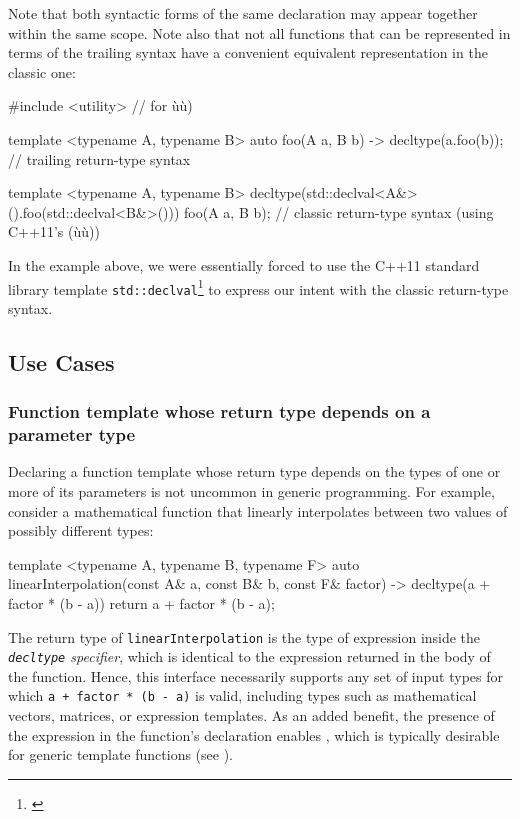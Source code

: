 \noindent Note that both syntactic forms of the same declaration may appear
together within the same scope. Note also that not all functions that
can be represented in terms of the trailing syntax have a convenient
equivalent representation in the classic one:

\begin{emcppslisting}
#include <utility>  // for ù{}ù)

template <typename A, typename B>
auto foo(A a, B b) -> decltype(a.foo(b));
    // trailing return-type syntax

template <typename A, typename B>
decltype(std::declval<A&>().foo(std::declval<B&>())) foo(A a, B b);
    // classic return-type syntax (using C++11's (ù{}ù))
\end{emcppslisting}

\noindent In the example above, we were essentially forced to use the C++11
standard library template \lstinline!std::declval!\footnote{\cite{cpprefdeclval}} to express our intent with the classic
return-type syntax.

\subsection[Use Cases]{Use Cases}\label{use-cases}

\subsubsection[Function template whose return type depends on a parameter type]{Function template whose return type depends on a parameter type}\label{function-template-whose-return-type-depends-on-a-parameter-type}

Declaring a function template whose return type depends on the types of
one or more of its parameters is not uncommon in generic programming.
For example, consider a mathematical function that linearly interpolates
between two values of possibly different types:

\begin{emcppslisting}
template <typename A, typename B, typename F>
auto linearInterpolation(const A& a, const B& b, const F& factor)
    -> decltype(a + factor * (b - a))
{
    return a + factor * (b - a);
}
\end{emcppslisting}

\noindent The return type of \lstinline!linearInterpolation! is the type of
expression inside the \emph{\lstinline!decltype! specifier}, which is
identical to the expression returned in the body of the function. Hence,
this interface necessarily supports any set of input types for which
\lstinline!a!~\lstinline!+!~\lstinline!factor!~\lstinline!*!~\lstinline!(b!~\lstinline!-!~\lstinline!a)!
is valid, including types such as mathematical vectors, matrices, or
expression templates. As an added benefit, the presence of the
expression in the function's declaration enables , which is typically desirable for generic template functions
(see %
).

